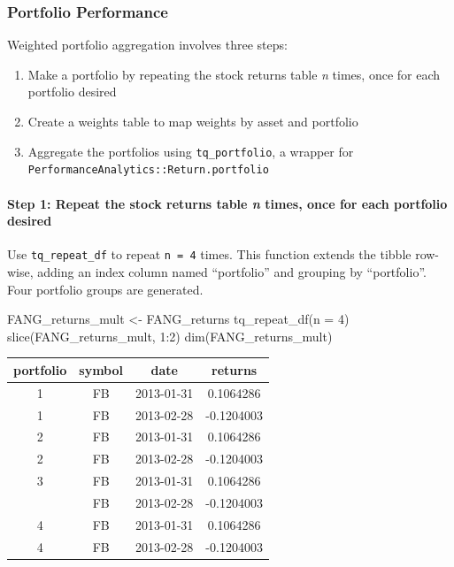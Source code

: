 \subsubsection{Portfolio Performance}\label{portfolio-performance}

Weighted portfolio aggregation involves three steps:

\begin{enumerate}
\def\labelenumi{\arabic{enumi}.}
\tightlist
\item
  Make a portfolio by repeating the stock returns table \emph{n} times,
  once for each portfolio desired
\item
  Create a weights table to map weights by asset and portfolio
\item
  Aggregate the portfolios using \texttt{tq\_portfolio}, a wrapper for
  \texttt{PerformanceAnalytics::Return.portfolio}
\end{enumerate}

\paragraph{\texorpdfstring{Step 1: Repeat the stock returns table
\emph{n} times, once for each portfolio
desired}{Step 1: Repeat the stock returns table n times, once for each portfolio desired}}\label{step-1-repeat-the-stock-returns-table-n-times-once-for-each-portfolio-desired}

Use \texttt{tq\_repeat\_df} to repeat \texttt{n\ =\ 4} times. This
function extends the tibble row-wise, adding an index column named
``portfolio'' and grouping by ``portfolio''. Four portfolio groups are
generated.

\begin{Schunk}
\begin{Sinput}
FANG_returns_mult <- FANG_returns %
    tq_repeat_df(n = 4)
slice(FANG_returns_mult, 1:2)
dim(FANG_returns_mult)
\end{Sinput}
\end{Schunk}

\begin{tabular}{cccc}
\toprule
portfolio & symbol & date & returns\\
\midrule
1 & FB & 2013-01-31 & 0.1064286\\
1 & FB & 2013-02-28 & -0.1204003\\
2 & FB & 2013-01-31 & 0.1064286\\
2 & FB & 2013-02-28 & -0.1204003\\
3 & FB & 2013-01-31 & 0.1064286\\
\addlinespace
3 & FB & 2013-02-28 & -0.1204003\\
4 & FB & 2013-01-31 & 0.1064286\\
4 & FB & 2013-02-28 & -0.1204003\\
\bottomrule
\end{tabular}

